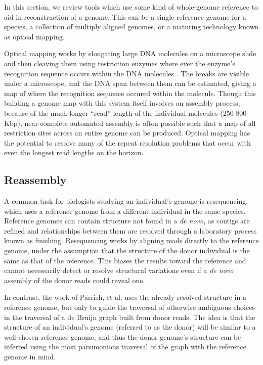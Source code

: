 \documentclass[doctor]{thesis}
\begin{document}
In this section, we review tools which use some kind of whole-genome reference to aid in reconstruction of a genome.  This can be a single reference genome for a species, a collection of multiply aligned genomes, or a maturing technology known as optical mapping. 

Optical mapping works by elongating large DNA molecules on a microscope slide and then cleaving them using restriction enzymes where ever the enzyme's recognition sequence occurs within the DNA molecules \cite{ORMenc}.
The breaks are visible under a microscope, and the DNA span between them can be estimated, giving a map of where the recognition sequence occured within the molecule.
Though this building a genome map with this system itself involves an assembly process, because of the much longer ``read'' length of the individual molecules (250-800 Kbp), near-complete automated assembly is often possible such that a map of all restriction sites across an entire genome can be produced.  Optical mapping has the potential to resolve many of the repeat resolution problems that occur with even the longest read lengths on the horizon.

\subsection{Reassembly}

A common task for biologists studying an individual's genome is resequencing, which uses a reference genome from a different individual in the same species.
Reference genomes can contain structure not found in a \emph{de novo}, as contigs are refined and relationships between them are resolved through a laboratory process known as finishing.
Resequencing works by aligning reads directly to the reference genome, under the assumption that the structure of the donor individual is the same as that of the reference.
This biases the results toward the reference and cannot necessarily detect or resolve structural variations even if a \emph{de novo} assembly of the donor reads could reveal one.

In contrast, the work of Parrish, et al. \cite{parrish2013genome} uses the already resolved structure in a reference genome, but only to guide the traversal of otherwise ambiguous choices in the traversal of a de Bruijn graph built from donor reads.
The idea is that the structure of an individual's genome (referred to as the donor) will be similar to a well-chosen reference genome, and thus the donor genome's structure can be inferred using the most parsimonious traversal of the graph with the reference genome in mind.
\end{document}
